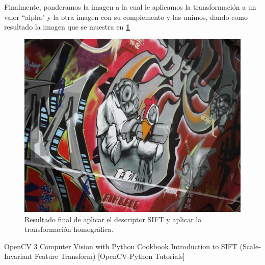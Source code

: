 \documentclass[11pt, a4paper]{article}
\begin{document}
	

	Finalmente, ponderamos la imagen a la cual le aplicamos la transformación a un valor ``alpha" y la otra imagen con su complemento y las unimos, dando como resultado la imagen que se muestra en \textcolor{blue}{\textbf{\ref{fig:sift_out}}}
	
	\begin{figure}[H]
		\centering
		\includegraphics[width=\textwidth]{Imagenes/sift_out.png}
		\caption{Resultado final de aplicar el descriptor SIFT y aplicar la transformación homográfica.}
		\label{fig:sift_out}
	\end{figure} 

	\begin{thebibliography}{0}
		\bibitem{}  OpenCV 3 Computer Vision with Python Cookbook 
		\bibitem{}  Introduction to SIFT (Scale-Invariant Feature Transform) [OpenCV-Python Tutorials]
	\end{thebibliography}
\end{document}

